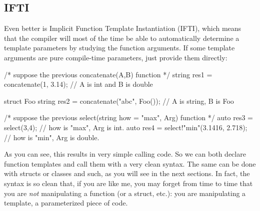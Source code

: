 
\subsection{IFTI}\label{ifti}

Even better is Implicit Function Template Instantiation (IFTI), which means that the compiler will most of the time be able to automatically determine a template parameters by studying the function arguments. If some template arguments are pure compile-time parameters, just provide them directly:

\begin{dcode}
/* suppose the previous concatenate(A,B) function */
string res1 = concatenate(1, 3.14); // A is int and B is double

struct Foo {}
string res2 = concatenate("abc", Foo()); // A is string, B is Foo

/* suppose the previous select(string how = "max", Arg) function */
auto res3 = select(3,4); // how is "max", Arg is int.
auto res4 = select!"min"(3.1416, 2.718); // how is "min", Arg is double.
\end{dcode}

As you can see, this results in very simple calling code. So we can both declare function templates and call them with a very clean syntax. The same can be done with structs or classes and such, as you will see in the next sections. In fact, the syntax is so clean that, if you are like me, you may forget from time to time that you are \emph{not} manipulating a function (or a struct, etc.): you are manipulating a template, a parameterized piece of code. 



